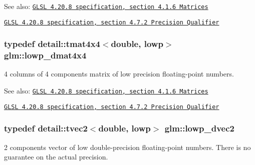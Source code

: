 \begin{Desc}
\item[See also:]\href{http://www.opengl.org/registry/doc/GLSLangSpec.4.20.8.pdf}{\tt GLSL 4.20.8 specification, section 4.1.6 Matrices} 

\href{http://www.opengl.org/registry/doc/GLSLangSpec.4.20.8.pdf}{\tt GLSL 4.20.8 specification, section 4.7.2 Precision Qualifier} \end{Desc}
\hypertarget{group__core__precision_gc762dec40f53114dfe6894499a2c9a79}{
\subsubsection[lowp\_\-dmat4x4]{\setlength{\rightskip}{0pt plus 5cm}typedef detail::tmat4x4$<$double, lowp$>$ {\bf glm::lowp\_\-dmat4x4}}}
\label{group__core__precision_gc762dec40f53114dfe6894499a2c9a79}


4 columns of 4 components matrix of low precision floating-point numbers.

\begin{Desc}
\item[See also:]\href{http://www.opengl.org/registry/doc/GLSLangSpec.4.20.8.pdf}{\tt GLSL 4.20.8 specification, section 4.1.6 Matrices} 

\href{http://www.opengl.org/registry/doc/GLSLangSpec.4.20.8.pdf}{\tt GLSL 4.20.8 specification, section 4.7.2 Precision Qualifier} \end{Desc}
\hypertarget{group__core__precision_g27a115a27d5f065e8c043f57191d583b}{
\subsubsection[lowp\_\-dvec2]{\setlength{\rightskip}{0pt plus 5cm}typedef detail::tvec2$<$double, lowp$>$ {\bf glm::lowp\_\-dvec2}}}
\label{group__core__precision_g27a115a27d5f065e8c043f57191d583b}


2 components vector of low double-precision floating-point numbers. There is no guarantee on the actual precision.

